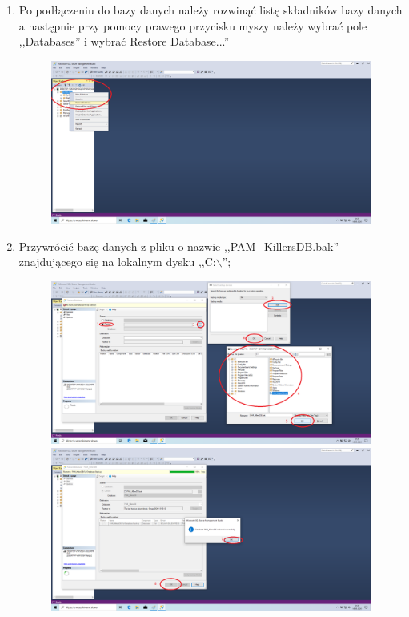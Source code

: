 \documentclass[12pt,a4paper]{article}
\begin{document}
\begin{enumerate}
\begin{figure}[H]
						\centering
					\end{figure}	
				\item Po podłączeniu do bazy danych należy rozwinąć listę składników bazy danych a następnie przy pomocy prawego przycisku myszy należy wybrać pole ,,Databases'' i wybrać 									Restore Database...''\\
					\begin{figure}[H]
						\includegraphics[scale=0.3]{img/Local_Install_10.png}
						\centering
					\end{figure}				 					
				\item Przywrócić bazę danych z pliku o nazwie ,,PAM\_KillersDB.bak'' znajdującego się na lokalnym dysku ,,C:$\backslash$'';
					\begin{figure}[H]
					
						\includegraphics[scale=0.3]{img/Local_Install_11.png}\\
						\includegraphics[scale=0.3]{img/Local_Install_12.png}
						\centering
						

\end{figure}
\end{enumerate}
\end{document}
